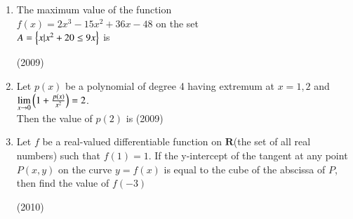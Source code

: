 \documentclass[journal,,12pt,twocolumn]{IEEEtran}
\theoremstyle{remark}
\begin{document}
\begin{enumerate}
\item The maximum value of the function \\
$f(x)=2x^3-15x^2+36x-48$ on the set\\
$A=\left\{x|x^2+20 \le 9x\right\}$ is

\hfill {(2009)}

\item Let $p(x)$ be a polynomial of degree 4 having extremum at $x=1,2 $ and $\lim \limits_{x\to 0} \left(1+\frac{p(x)}{x^2}\right) = 2$.\\
Then the value of $p(2)$ is
\hfill{(2009)}
\item Let $f$ be a real-valued differentiable function on $\textbf{R}$(the set of all real numbers) such that $f(1)=1$. If the y-intercept of the tangent at any point $P(x,y)$ on the curve $y=f(x)$ is equal to the cube of the abscissa of $P$, then find the value of $f(-3)$

    \hfill {(2010)}


\end{enumerate}
\end{document}
